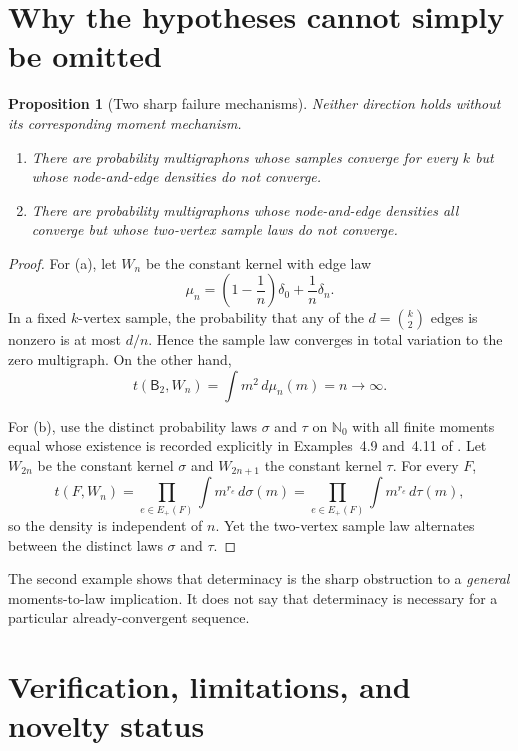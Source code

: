\documentclass[11pt]{article}
\newtheorem{proposition}[theorem]{Proposition}
\theoremstyle{remark}
\newcommand{\N}{\mathbb N}
\newcommand{\Bn}{\mathsf B}
\begin{document}
\section{Why the hypotheses cannot simply be omitted}

\begin{proposition}[Two sharp failure mechanisms]\label{prop:sharp}
Neither direction holds without its corresponding moment mechanism.

\begin{enumerate}[label=\textup{(\alph*)},leftmargin=2em]
\item There are probability multigraphons whose samples converge for every
$k$ but whose node-and-edge densities do not converge.
\item There are probability multigraphons whose node-and-edge densities all
converge but whose two-vertex sample laws do not converge.
\end{enumerate}
\end{proposition}

\begin{proof}
For (a), let $W_n$ be the constant kernel with edge law
\[
 \mu_n=\left(1-\frac1n\right)\delta_0+\frac1n\delta_n.
\]
In a fixed $k$-vertex sample, the probability that any of the
$d=\binom{k}{2}$ edges is nonzero is at most $d/n$.  Hence the sample law
converges in total variation to the zero multigraph.  On the other hand,
\[
 t(\Bn_2,W_n)=\int m^2\,d\mu_n(m)=n\longrightarrow\infty.
\]

For (b), use the distinct probability laws $\sigma$ and $\tau$ on $\N_0$
with all finite moments equal whose existence is recorded explicitly in
Examples~4.9 and~4.11 of \cite{KLS}.  Let $W_{2n}$ be the constant kernel
$\sigma$ and $W_{2n+1}$ the constant kernel $\tau$.  For every $F$,
\[
 t(F,W_n)=\prod_{e\in E_+(F)}
 \int m^{r_e}\,d\sigma(m)
 =\prod_{e\in E_+(F)}
 \int m^{r_e}\,d\tau(m),
\]
so the density is independent of $n$.  Yet the two-vertex sample law
alternates between the distinct laws $\sigma$ and $\tau$.
\end{proof}

The second example shows that determinacy is the sharp obstruction to a
\emph{general} moments-to-law implication.  It does not say that determinacy
is necessary for a particular already-convergent sequence.

\section{Verification, limitations, and novelty status}
\end{document}
